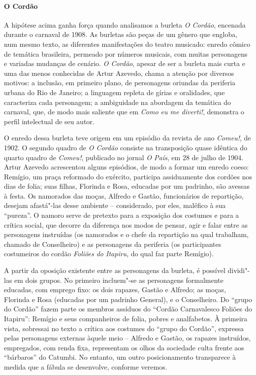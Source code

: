 \paragraph{O Cordão}
A hipótese acima ganha força quando analisamos a burleta \textit{O
Cordão}, encenada durante o carnaval de 1908. As burletas são peças de
um gênero que engloba, num mesmo texto, as diferentes manifestações do
teatro musicado: enredo cômico de temática brasileira, permeado por
números musicais, com muitas personagens e variadas mudanças de
cenário. \textit{O Cordão}, apesar de ser a burleta mais curta e uma
das menos conhecidas de Artur Azevedo, chama a atenção por diversos
motivos: a inclusão, em primeiro plano, de personagens oriundas da
periferia urbana do Rio de Janeiro; a linguagem repleta de gírias e
oralidades, que caracteriza cada personagem; a ambiguidade na abordagem
da temática do carnaval, que, de modo mais saliente que em \textit{Como
eu me diverti!}, demonstra o perfil intelectual de seu autor.

O enredo dessa burleta teve origem em um episódio da revista de ano
\textit{Comeu!}, de 1902. O segundo quadro de \textit{O Cordão}
consiste na transposição quase idêntica do quarto quadro de
\textit{Comeu!}, publicado no jornal \textit{O País}, em 28 de julho de
1904. Artur Azevedo acrescentou alguns episódios, de modo a formar um
enredo coeso: Remígio, um praça reformado do exército, participa
assiduamente dos cordões nos dias de folia; suas filhas, Florinda e
Rosa, educadas por um padrinho, são avessas à festa. Os namorados das
moças, Alfredo e Gastão, funcionários de repartição, desejam afastá"-las
desse ambiente -- considerado, por eles, maléfico à sua “pureza”. O
namoro serve de pretexto para a exposição dos costumes e para a crítica
social, que decorre da diferença nos modos de pensar, agir e falar
entre as personagens instruídas (os namorados e o chefe da repartição
na qual trabalham, chamado de Conselheiro) e as personagens da
periferia (os participantes costumeiros do cordão \textit{Foliões do
Itapiru}, do qual faz parte Remígio).

A partir da oposição existente entre as personagens da burleta, é
possível dividi"-las em dois grupos. No primeiro incluem"-se as
personagens formalmente educadas, com emprego fixo: os dois rapazes,
Gastão e Alfredo; as moças, Florinda e Rosa (educadas por um padrinho
General), e o Conselheiro. Do “grupo do Cordão” fazem parte os
membros assíduos do “Cordão Carnavalesco Foliões do Itapiru”:
Remígio e seus companheiros de folia, pobres e analfabetos. À primeira
vista, sobressai no texto a crítica aos costumes do “grupo do Cordão”,
expressa pelas personagens externas àquele meio -- Alfredo e Gastão, os
rapazes instruídos, empregados, com renda fixa, representam os olhos da
sociedade culta frente aos “bárbaros” do Catumbi. No entanto, um outro
posicionamento transparece à medida que a fábula se desenvolve,
conforme veremos.

